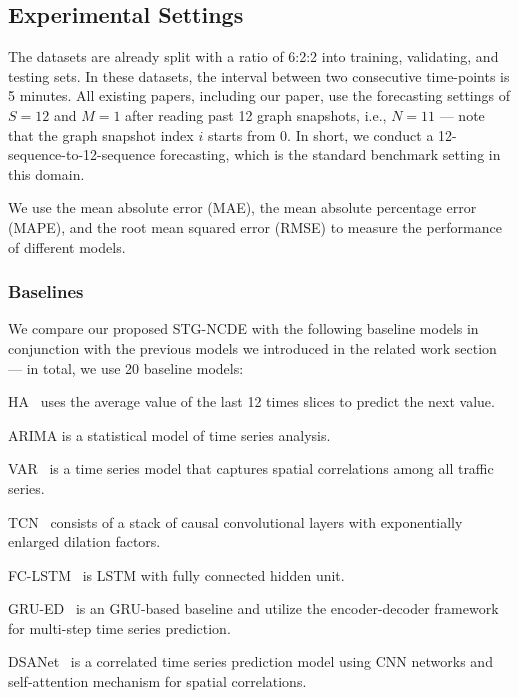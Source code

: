 \documentclass[letterpaper]{article} \usepackage{aaai22}  \usepackage{times}  \usepackage{helvet}  \usepackage{courier}  \usepackage[hyphens]{url}  \usepackage{graphicx} \urlstyle{rm} \def\UrlFont{\rm}  \usepackage{natbib}  \usepackage{caption} \DeclareCaptionStyle{ruled}{labelfont=normalfont,labelsep=colon,strut=off} \frenchspacing  \setlength{\pdfpagewidth}{8.5in}  \setlength{\pdfpageheight}{11in}  \usepackage{stfloats}
\begin{document}
\subsection{Experimental Settings}
The datasets are already split with a ratio of 6:2:2 into training, validating, and testing sets. In these datasets, the interval between two consecutive time-points is 5 minutes. All existing papers, including our paper, use the forecasting settings of $S=12$ and $M=1$ after reading past 12 graph snapshots, i.e., $N=11$ --- note that the graph snapshot index $i$ starts from $0$. In short, we conduct a 12-sequence-to-12-sequence forecasting, which is the standard benchmark setting in this domain.

We use the mean absolute error (MAE), the mean absolute percentage error (MAPE), and the root mean squared error (RMSE) to measure the performance of different models.
\subsubsection{Baselines}
We compare our proposed STG-NCDE with the following baseline models in conjunction with the previous models we introduced in the related work section --- in total, we use 20 baseline models:
\begin{compactenum}
    \item HA~\cite{hamilton2020time} uses the average value of the last 12 times slices to predict the next value.
    \item ARIMA is a statistical model of time series analysis.
    \item VAR~\cite{hamilton2020time} is a time series model that captures spatial correlations among all traffic series.
    \item TCN~\cite{BaiTCN2018} consists of a stack of causal convolutional layers with exponentially enlarged dilation factors.
\item FC-LSTM~\cite{sutskever2014sequence} is LSTM with fully connected hidden unit.
    \item GRU-ED~\cite{cho2014grued} is an GRU-based baseline and utilize the encoder-decoder framework for multi-step time series prediction.
    \item DSANet~\cite{Huang2019DSANet} is a correlated time series prediction model using CNN networks and self-attention mechanism for spatial correlations.
\end{compactenum}
\end{document}
